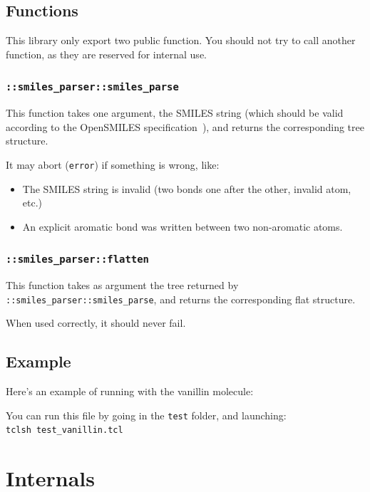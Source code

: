 \documentclass[a4paper, 11pt]{article}
\begin{document}
\subsection{Functions}

This library only export two public function. You should not try to call another function, as they are reserved for internal use.

\subsubsection{\tt ::smiles\_parser::smiles\_parse}\label{subsubsec:intf_smiles_parse}

This function takes one argument, the SMILES string (which should be valid according to the OpenSMILES specification~\cite{OpenSMILES}), and returns the corresponding tree structure.

It may abort ({\tt error}) if something is wrong, like:
\begin{itemize}
    \item The SMILES string is invalid (two bonds one after the other, invalid atom, etc.)
    \item An explicit aromatic bond was written between two non-aromatic atoms.
\end{itemize}

\subsubsection{\tt ::smiles\_parser::flatten}\label{subsubsec:intf_flatten}

This function takes as argument the tree returned by {\tt ::smiles\_parser::smiles\_parse}, and returns the corresponding flat structure.

When used correctly, it should never fail.

\subsection{Example}

Here's an example of running with the vanillin molecule:



You can run this file by going in the \texttt{test} folder, and launching: \\
\texttt{tclsh test\_vanillin.tcl}

\section{Internals}
\label{sec:internals}
\end{document}
